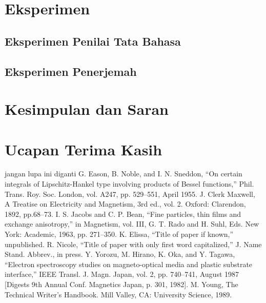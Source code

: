 \documentclass[conference]{IEEEtran}
\begin{document}
\section{Eksperimen}

\subsection{Eksperimen Penilai Tata Bahasa}

\subsection{Eksperimen Penerjemah}

\section{Kesimpulan dan Saran}

\section*{Ucapan Terima Kasih}

\begin{thebibliography}{00}
 jangan lupa ini diganti
 G. Eason, B. Noble, and I. N. Sneddon, ``On certain integrals of Lipschitz-Hankel type involving products of Bessel functions,'' Phil. Trans. Roy. Soc. London, vol. A247, pp. 529--551, April 1955.
 J. Clerk Maxwell, A Treatise on Electricity and Magnetism, 3rd ed., vol. 2. Oxford: Clarendon, 1892, pp.68--73.
 I. S. Jacobs and C. P. Bean, ``Fine particles, thin films and exchange anisotropy,'' in Magnetism, vol. III, G. T. Rado and H. Suhl, Eds. New York: Academic, 1963, pp. 271--350.
 K. Elissa, ``Title of paper if known,'' unpublished.
 R. Nicole, ``Title of paper with only first word capitalized,'' J. Name Stand. Abbrev., in press.
 Y. Yorozu, M. Hirano, K. Oka, and Y. Tagawa, ``Electron spectroscopy studies on magneto-optical media and plastic substrate interface,'' IEEE Transl. J. Magn. Japan, vol. 2, pp. 740--741, August 1987 [Digests 9th Annual Conf. Magnetics Japan, p. 301, 1982].
 M. Young, The Technical Writer's Handbook. Mill Valley, CA: University Science, 1989.
\end{thebibliography}
\end{document}
